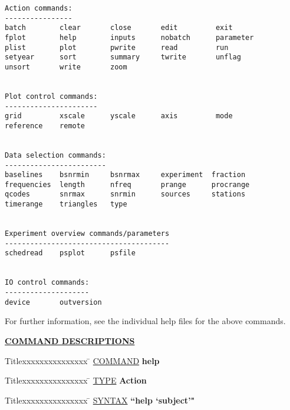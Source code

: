 \begin{verbatim}
Action commands:
----------------
batch        clear       close       edit         exit
fplot        help        inputs      nobatch      parameter
plist        plot        pwrite      read         run
setyear      sort        summary     twrite       unflag
unsort       write       zoom


Plot control commands:
----------------------
grid         xscale      yscale      axis         mode
reference    remote


Data selection commands:
------------------------
baselines    bsnrmin     bsnrmax     experiment  fraction
frequencies  length      nfreq       prange      procrange
qcodes       snrmax      snrmin      sources     stations
timerange    triangles   type


Experiment overview commands/parameters
---------------------------------------
schedread    psplot      psfile


IO control commands:
--------------------
device       outversion

\end{verbatim}

For further information, see the individual help files for the
above commands.

\newpage

\begin{center}
\Large\bf
\underline{COMMAND DESCRIPTIONS}
\end{center}
\vspace{.3in}

\begin{tabbing}
Titlexxxxxxxxxxxxxxx \= \kill
\underline{COMMAND} \> {\bf    help} \\
\end{tabbing}

\begin{tabbing}
Titlexxxxxxxxxxxxxxx \= \kill
\underline{TYPE} \> {\bf            Action} \\
\end{tabbing}

\begin{tabbing}
Titlexxxxxxxxxxxxxxx \= \kill
\underline{SYNTAX} \> {\bf          ``help `subject'"} \\
\end{tabbing}

